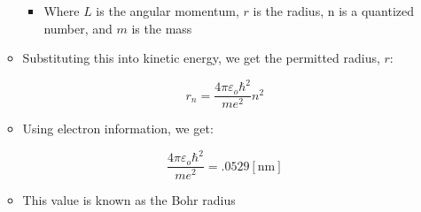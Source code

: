 \begin{itemize}
\begin{itemize}
        \begin{itemize}

          \item Where $L$ is the angular momentum, $r$ is the radius, n is a quantized number, and $m$ is the mass

        \end{itemize}

      \item Substituting this into kinetic energy, we get the permitted radius, $r$:

        $$\boxed{r_n=\frac{4\pi\varepsilon_o\hbar^2}{me^2}n^2}$$

      \item Using electron information, we get:

        $$\frac{4\pi\varepsilon_o\hbar^2}{me^2}=.0529[\si{\nano\meter}]$$

      \item This value is known as the Bohr radius

    \end{itemize}

\end{itemize}



